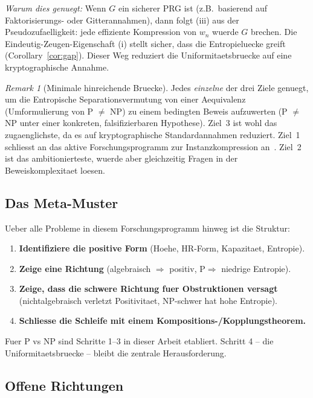 \documentclass[aps,prd,twocolumn,superscriptaddress,nofootinbib]{revtex4-2}
\theoremstyle{definition}
\theoremstyle{remark}
\newtheorem{remark}[theorem]{Remark}
\newcommand{\PP}{\mathrm{P}}
\begin{document}
\begin{description}
\emph{Warum dies genuegt:} Wenn $G$ ein sicherer PRG ist (z.B.\ basierend auf Faktorisierungs- oder Gitterannahmen), dann folgt (iii) aus der Pseudozufaelligkeit: jede effiziente Kompression von $w_n$ wuerde $G$ brechen. Die Eindeutig-Zeugen-Eigenschaft (i) stellt sicher, dass die Entropieluecke greift (Corollary~\ref{cor:gap}). Dieser Weg reduziert die Uniformitaetsbruecke auf eine kryptographische Annahme.
\end{description}

\begin{remark}[Minimale hinreichende Bruecke]
\label{rem:minimal-bridge}
Jedes \emph{einzelne} der drei Ziele genuegt, um die Entropische Separationsvermutung von einer Aequivalenz (Umformulierung von P $\neq$ NP) zu einem bedingten Beweis aufzuwerten (P $\neq$ NP unter einer konkreten, falsifizierbaren Hypothese). Ziel~3 ist wohl das zugaenglichste, da es auf kryptographische Standardannahmen reduziert. Ziel~1 schliesst an das aktive Forschungsprogramm zur Instanzkompression an~\cite{Drucker2015}. Ziel~2 ist das ambitionierteste, wuerde aber gleichzeitig Fragen in der Beweiskomplexitaet loesen.
\end{remark}

\subsection{Das Meta-Muster}

Ueber alle Probleme in diesem Forschungsprogramm hinweg ist die Struktur:

\begin{enumerate}
\item \textbf{Identifiziere die positive Form} (Hoehe, HR-Form, Kapazitaet, Entropie).
\item \textbf{Zeige eine Richtung} (algebraisch $\Rightarrow$ positiv, $\PP \Rightarrow$ niedrige Entropie).
\item \textbf{Zeige, dass die schwere Richtung fuer Obstruktionen versagt} (nichtalgebraisch verletzt Positivitaet, NP-schwer hat hohe Entropie).
\item \textbf{Schliesse die Schleife mit einem Kompositions-/Kopplungstheorem.}
\end{enumerate}

Fuer P vs NP sind Schritte 1--3 in dieser Arbeit etabliert. Schritt 4 -- die Uniformitaetsbruecke -- bleibt die zentrale Herausforderung.

\subsection{Offene Richtungen}
\end{document}
